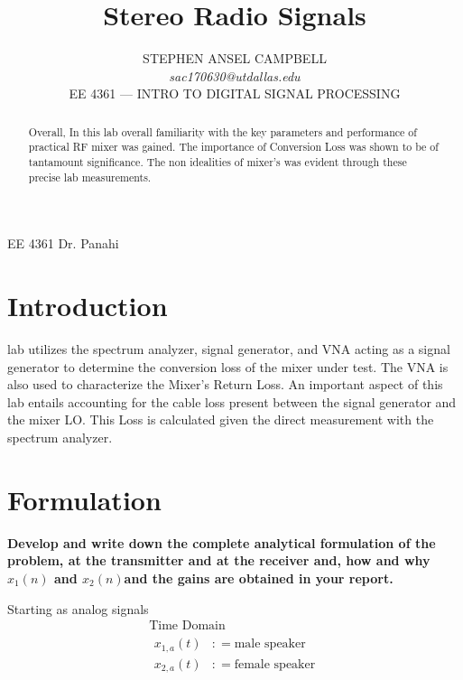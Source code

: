 \documentclass[journal]{IEEEtran}
\newcommand{\eqdef}{\mathrel{:\mathop=}}
\begin{document}
\title{Stereo Radio Signals}

\author{STEPHEN ANSEL CAMPBELL \\
    \emph{sac170630@utdallas.edu} \\
    EE 4361 --- INTRO TO DIGITAL SIGNAL PROCESSING
}

{EE 4361 Dr. Panahi}

\maketitle

\begin{abstract}
    Overall, In this lab  overall familiarity with the key parameters and
    performance of practical RF mixer was gained. The importance of Conversion Loss
    was shown to be of tantamount significance. The non idealities of mixer's was
    evident through these precise lab measurements.
\end{abstract}

\section{Introduction}

 lab utilizes the spectrum analyzer, signal generator, and VNA acting as a
signal generator to determine the conversion loss of the mixer under test. The
VNA is also used to characterize the Mixer's Return Loss. An important aspect of
this lab entails accounting for the cable loss present between the signal
generator and the mixer LO. This Loss is calculated given the direct measurement
with the spectrum analyzer.

\section{Formulation}

\textbf{Develop and write down the complete analytical formulation of the
    problem, at the transmitter and at the receiver and, how and why \(x_1(n)\) and
    \(x_2(n)\)and the gains are obtained in your report.}

Starting as analog signals
\begin{gather*}
    \text{Time Domain}\\
    \begin{aligned}
        x_{1,a}( t) & \eqdef \text{male speaker}   \\
        x_{2,a}( t) & \eqdef \text{female speaker}
    \end{aligned}
\end{gather*}
\end{document}
